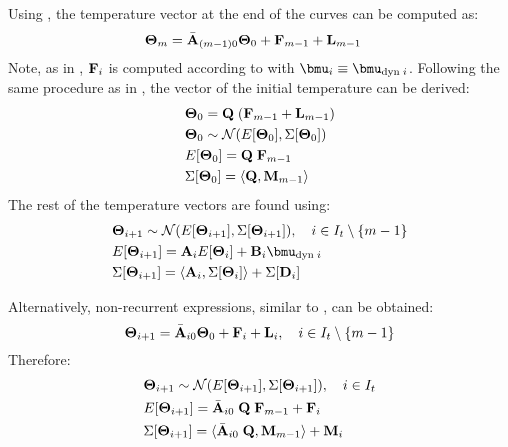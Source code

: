 Using , the temperature vector at the end of the curves can be computed as:
\begin{align*}
  \mathbf{\Theta}_{m} & = \Bar{\mathbf{A}}_{(m - 1)0} \mathbf{\Theta}_0 + \mathbf{F}_{m - 1} + \mathbf{L}_{m - 1}
\end{align*}
Note, as in , $\mathbf{F}_i$ is computed according to  with $\vmean{i} \equiv \vmean{\dyn \; i}$. Following the same procedure as in , the vector of the initial temperature can be derived:
\begin{align*}
  & \mathbf{\Theta}_0 = \mathbf{Q} \; (\mathbf{F}_{m - 1} + \mathbf{L}_{m - 1}) \\
  & \mathbf{\Theta}_0 \sim \mathcal{N}(E[\mathbf{\Theta}_0], \Sigma[\mathbf{\Theta}_0]) \\
  & E[\mathbf{\Theta}_0] = \mathbf{Q} \; \mathbf{F}_{m - 1} \\
  & \Sigma[\mathbf{\Theta}_0] = \langle \mathbf{Q}, \mathbf{M}_{m - 1} \rangle
\end{align*}
The rest of the temperature vectors are found using:
\begin{align*}
  & \vtemp_{i + 1} \sim \normal(\expect{\vtemp_{i + 1}}, \cov{\vtemp_{i + 1}}), \sep i \in \timeindex \setminus \{\stepcount - 1\} \\
  & \expect{\vtemp_{i+1}} = \m{A}_i \expect{\vtemp_i} + \m{B}_i \vmean{\dyn \; i} \\
  & \cov{\vtemp_{i+1}} = \dbl{\m{A}_i, \cov{\vtemp_i}} + \cov{\m{D}_i}
\end{align*}

Alternatively, non-recurrent expressions, similar to , can be obtained:
\begin{equation*}
  \mathbf{\Theta}_{i + 1} = \Bar{\mathbf{A}}_{i0} \mathbf{\Theta}_0 + \mathbf{F}_i + \mathbf{L}_i, \hspace{10pt} i \in I_t \setminus \{m - 1\}
\end{equation*}
Therefore:
\begin{align*}
  & \mathbf{\Theta}_{i + 1} \sim \mathcal{N}(E[\mathbf{\Theta}_{i + 1}], \Sigma[\mathbf{\Theta}_{i + 1}]), \hspace{10pt} i \in I_t \\
  & E[\mathbf{\Theta}_{i + 1}] = \Bar{\mathbf{A}}_{i0} \; \mathbf{Q} \; \mathbf{F}_{m - 1} + \mathbf{F}_i \\
  & \Sigma[\mathbf{\Theta}_{i + 1}] = \langle \Bar{\mathbf{A}}_{i0} \; \mathbf{Q}, \mathbf{M}_{m - 1} \rangle + \mathbf{M}_i
\end{align*}
